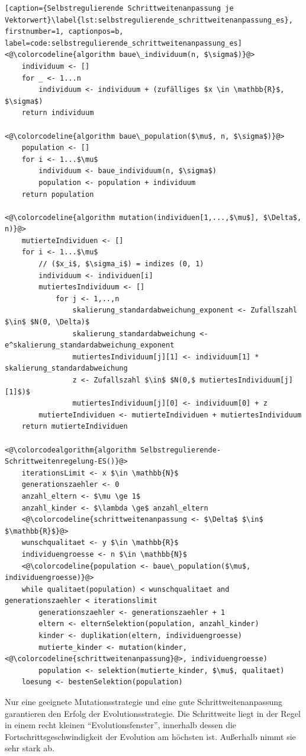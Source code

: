 \begin{lstlisting}[caption={Selbstregulierende Schrittweitenanpassung je Vektorwert}\label{lst:selbstregulierende_schrittweitenanpassung_es}, firstnumber=1, captionpos=b, label=code:selbstregulierende_schrittweitenanpassung_es]
<@\colorcodeline{algorithm baue\_individuum(n, $\sigma$)}@>
	individuum <- []
	for _ <- 1...n
		individuum <- individuum + (zufälliges $x \in \mathbb{R}$, $\sigma$)
	return individuum
	
<@\colorcodeline{algorithm baue\_population($\mu$, n, $\sigma$)}@>
	population <- []
	for i <- 1...$\mu$
		individuum <- baue_individuum(n, $\sigma$)
		population <- population + individuum
	return population

<@\colorcodeline{algorithm mutation(individuen[1,...,$\mu$], $\Delta$, n)}@>
	mutierteIndividuen <- []
	for i <- 1...$\mu$
		// ($x_i$, $\sigma_i$) = indizes (0, 1)
		individuum <- individuen[i]
		mutiertesIndividuum <- []
			for j <- 1,..,n
				skalierung_standardabweichung_exponent <- Zufallszahl $\in$ $N(0, \Delta)$
				skalierung_standardabweichung <- e^skalierung_standardabweichung_exponent
				mutiertesIndividuum[j][1] <- individuum[1] * skalierung_standardabweichung
				z <- Zufallszahl $\in$ $N(0,$ mutiertesIndividuum[j][1]$)$
				mutiertesIndividuum[j][0] <- individuum[0] + z
		mutierteIndividuen <- mutierteIndividuen + mutiertesIndividuum
	return mutierteIndividuen

<@\colorcodealgorithm{algorithm Selbstregulierende-Schrittweitenregelung-ES()}@>
	iterationsLimit <- x $\in \mathbb{N}$
	generationszaehler <- 0
	anzahl_eltern <- $\mu \ge 1$
	anzahl_kinder <- $\lambda \ge$ anzahl_eltern
	<@\colorcodeline{schrittweitenanpassung <- $\Delta$ $\in$ $\mathbb{R}$}@>
	wunschqualitaet <- y $\in \mathbb{R}$
	individuengroesse <- n $\in \mathbb{N}$
	<@\colorcodeline{population <- baue\_population($\mu$, individuengroesse)}@>
	while qualitaet(population) < wunschqualitaet and generationszaehler < iterationslimit
		generationszaehler <- generationszaehler + 1
		eltern <- elternSelektion(population, anzahl_kinder)
		kinder <- duplikation(eltern, individuengroesse)
		mutierte_kinder <- mutation(kinder, <@\colorcodeline{schrittweitenanpassung}@>, individuengroesse)
		population <- selektion(mutierte_kinder, $\mu$, qualitaet)
	loesung <- bestenSelektion(population)
\end{lstlisting}

Nur eine geeignete Mutationsstrategie und eine gute Schrittweitenanpassung garantieren den Erfolg der Evolutionsstrategie.
Die Schrittweite liegt in der Regel in einem recht kleinen \enquote{Evolutionsfenster}, innerhalb dessen die Fortschrittsgeschwindigkeit der Evolution am höchsten ist. Außerhalb nimmt sie sehr stark ab.
